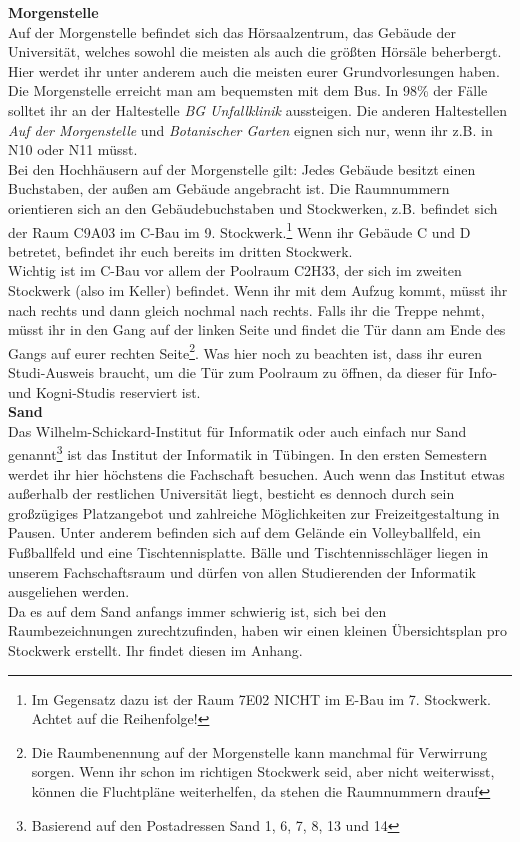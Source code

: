 \textbf{Morgenstelle}\\
Auf der Morgenstelle befindet sich das Hörsaalzentrum, das Gebäude der Universität, welches sowohl die meisten als auch die größten Hörsäle beherbergt. Hier werdet ihr unter anderem auch die meisten eurer Grundvorlesungen haben.\\
Die Morgenstelle erreicht man am bequemsten mit dem Bus. In 98\% der Fälle solltet ihr an der Haltestelle \emph{BG Unfallklinik} aussteigen. Die anderen Haltestellen \emph{Auf der Morgenstelle} und \emph{Botanischer Garten} eignen sich nur, wenn ihr z.B. in N10 oder N11 müsst.\\ Bei den Hochhäusern auf der Morgenstelle gilt: Jedes Gebäude besitzt einen Buchstaben, der außen am Gebäude angebracht ist.  Die Raumnummern orientieren sich an den Gebäudebuchstaben und Stockwerken, z.B. befindet sich der Raum C9A03 im C-Bau im 9. Stockwerk.\footnote{Im Gegensatz dazu ist der Raum 7E02 NICHT im E-Bau im 7. Stockwerk. Achtet auf die Reihenfolge!} Wenn ihr Gebäude C und D betretet, befindet ihr euch bereits im dritten Stockwerk.\\
Wichtig ist im C-Bau vor allem der Poolraum C2H33, der sich im zweiten Stockwerk (also im Keller) befindet. Wenn ihr mit dem Aufzug kommt, müsst ihr nach rechts und dann gleich nochmal nach rechts. Falls ihr die Treppe nehmt, müsst ihr in den Gang auf der linken Seite und findet die Tür dann am Ende des Gangs auf eurer rechten Seite\footnote{Die Raumbenennung auf der Morgenstelle kann manchmal für Verwirrung sorgen. Wenn ihr schon im richtigen Stockwerk seid, aber nicht weiterwisst, können die Fluchtpläne weiterhelfen, da stehen die Raumnummern drauf}. Was hier noch zu beachten ist, dass ihr euren Studi-Ausweis braucht, um die Tür zum Poolraum zu öffnen, da dieser für Info- und Kogni-Studis reserviert ist.\\
\newpage
\textbf{Sand}\\
Das Wilhelm-Schickard-Institut für Informatik oder auch einfach nur Sand genannt\footnote{Basierend auf den Postadressen Sand 1, 6, 7, 8, 13 und 14} ist das Institut der Informatik in Tübingen. In den ersten Semestern werdet ihr hier höchstens die Fachschaft besuchen. Auch wenn das Institut etwas außerhalb der restlichen Universität liegt, besticht es dennoch durch sein großzügiges Platzangebot und zahlreiche Möglichkeiten zur Freizeitgestaltung in Pausen. Unter anderem befinden sich auf dem Gelände ein Volleyballfeld, ein Fußballfeld und eine Tischtennisplatte. Bälle und Tischtennisschläger liegen in unserem Fachschaftsraum und dürfen von allen Studierenden der Informatik ausgeliehen werden.\\
Da es auf dem Sand anfangs immer schwierig ist, sich bei den Raumbezeichnungen zurechtzufinden, haben wir einen kleinen Übersichtsplan pro Stockwerk erstellt. Ihr findet diesen im Anhang.


